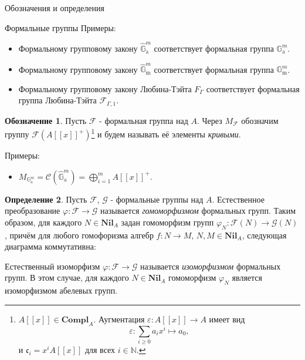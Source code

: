\documentclass[a4paper,14pt]{extarticle}
\theoremstyle{definition}
\newtheorem{definition}{Определение}[section]
\newtheorem{denotation}[definition]{Обозначение}
\newcommand{\Compl}[1]{\mathbf{Compl}_{#1}}
\newcommand{\Nil}[1]{\mathbf{Nil}_{#1}}
\newcommand{\bG}{\mathbb{G}}
\newcommand{\bN}{\mathbb{N}}
\newcommand{\fc}{\mathfrak{c}}
\newcommand{\sC}{\mathscr{C}}
\newcommand{\sF}{\mathscr{F}}
\newcommand{\sG}{\mathscr{G}}
\newcommand{\Ga}{\bG_{\mathrm{a}}}
\newcommand{\Gm}{\bG_{\mathrm{m}}}
\newcommand{\GGa}{\hat{\bG}_{\mathrm{a}}}
\newcommand{\GGm}{\hat{\bG}_{\mathrm{m}}}
\begin{document}
\begin{section}{Обозначения и определения}
\begin{subsection}{Формальные группы}
Примеры:
\begin{itemize}
    \item Формальному групповому закону $\GGa^m$ соответствует формальная группа $\Ga^m$.
    \item Формальному групповому закону $\GGm^m$ соответствует формальная группа $\Gm^m$.
    \item Формальному групповому закону Любина-Тэйта $F_\Gamma$ соответствует формальная группа Любина-Тэйта ${ \sF_{\Gamma, 1} }$.
\end{itemize}

\begin{denotation}\label{denote:3.3:curves_group}
    Пусть $\sF$ - формальная группа над $A$. Через $M_\sF$ обозначим группу $\sF(A[[x]]^+)$\footnote{
        ${ A[[x]] \in \Compl{A} }$. Аугментация ${ \varepsilon : A[[x]] \rightarrow A }$ имеет вид
        \begin{equation*}
            \varepsilon :
            \sum_{i \geq 0} a_i x^i \mapsto
            a_0,
        \end{equation*}
        и ${ \fc_i = x^i A[[x]] }$ для всех ${ i \in \bN }$.
    } и будем называть её элементы \textit{кривыми}.
\end{denotation}

Примеры:
\begin{itemize}
    \item ${ M_{\Ga^m} = \sC(\GGa^m) = \bigoplus\limits_{i = 1}^m A[[x]]^+ }$.
\end{itemize}

\begin{definition}\label{def:3.4:formal_group_hom}
    Пусть $\sF$, $\sG$ - формальные группы над $A$. Естественное преобразование ${ \varphi : \sF \rightarrow \sG }$ называется \textit{гомоморфизмом} формальных групп. Таким образом, для каждого ${ N \in \Nil{A} }$ задан гомоморфизм групп ${ \varphi_N : \sF(N) \rightarrow \sG(N) }$, причём для любого гомофоризма алгебр ${ f : N \rightarrow M }$, ${ N, M \in \Nil{A} }$, следующая диаграмма коммутативна:
    \begin{center}
    \end{center}
    Естественный изоморфизм ${ \varphi : \sF \rightarrow \sG }$ называется \textit{изоморфизмом} формальных групп. В этом случае, для каждого ${ N \in \Nil{A} }$ гомоморфизм $\varphi_N$ является изоморфизмом абелевых групп.
\end{definition}


\end{subsection}
\end{section}
\end{document}

